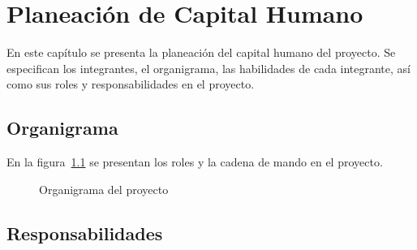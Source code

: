 
\chapter{Planeación de Capital Humano}	
\label{cap:capHumano}

	En este capítulo se presenta la planeación del capital humano del proyecto. Se especifican los integrantes, el organigrama, las habilidades de cada integrante, así como sus roles y responsabilidades en el proyecto.

\section{Organigrama}	


En la figura~\ref{fig:organigrama} se presentan los roles y la cadena de mando en el proyecto. 

\begin{figure}[htbp]
	\begin{center}
		\caption{Organigrama del proyecto}
		\label{fig:organigrama}
	\end{center}
\end{figure}


\section{Responsabilidades}



